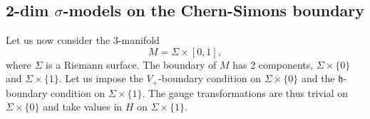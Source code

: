 \documentclass[a4paper]{amsart}
\theoremstyle{plain}
\theoremstyle{definition}
\newcommand{\g}{\mathfrak{g}}
\newcommand{\h}{\mathfrak{h}}
\newcommand{\la}{\langle}
\newcommand{\ra}{\rangle}
\begin{document}





\subsection{2-dim $\sigma$-models on the Chern-Simons boundary}

Let us now consider the 3-manifold 
$$M=\Sigma\times [0,1],$$
where $\Sigma$ is a Riemann surface.
The boundary of $M$ has 2 components, $\Sigma\times\{0\}$ and $\Sigma\times\{1\}$.
Let us impose the $V_+$-boundary condition on $\Sigma\times\{0\}$ and the $\h$-boundary condition on $\Sigma\times\{1\}$. The gauge transformations are thus trivial on $\Sigma\times\{0\}$ and take values in $H$ on $\Sigma\times\{1\}$. 
\end{document}
